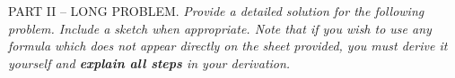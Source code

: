 \vspace{1.5cm}

PART II -- LONG PROBLEM. 
\textit{Provide a detailed solution for the following problem.  Include a sketch when appropriate.  Note that if you wish to use any formula which does not appear directly on the sheet provided, you must derive it yourself and \textbf{explain all steps} in your derivation.}

\hspace{4.0cm}
